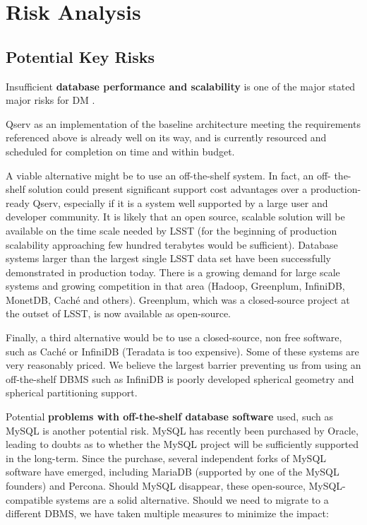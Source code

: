 \documentclass[DM,lsstdraft,toc]{lsstdoc}
\begin{document}
\section{Risk Analysis}\label{risk-analysis}

\subsection{Potential Key Risks}\label{potential-key-risks}

Insufficient \textbf{database performance and scalability} is one of the
major stated major risks for DM .

Qserv as an implementation of the baseline architecture meeting the
requirements referenced above is already well on its way, and is currently
resourced and scheduled for completion on time and within budget.

A viable alternative might be to use an off-the-shelf system. In fact, an off-
the-shelf solution could present significant support cost advantages over a
production-ready Qserv, especially if it is a system well supported by a large
user and developer community. It is likely that an open source, scalable
solution will be available on the time scale needed by LSST (for the beginning
of production scalability approaching few hundred terabytes would be
sufficient). Database systems larger than the largest single LSST data set
have been successfully demonstrated in production today.  There is a growing
demand for large scale systems and growing competition in that area (Hadoop,
Greenplum, InfiniDB, MonetDB, Caché and others).  Greenplum, which was a
closed-source project at the outset of LSST, is now available as open-source.

Finally, a third alternative would be to use a closed-source, non free
software, such as Caché or InfiniDB (Teradata is too expensive). Some of these
systems are very reasonably priced. We believe the largest barrier preventing
us from using an off-the-shelf DBMS such as InfiniDB is poorly developed
spherical geometry and spherical partitioning support.

Potential \textbf{problems with off-the-shelf database software} used,
such as MySQL is another potential risk. MySQL has recently been
purchased by Oracle, leading to doubts as to whether the MySQL project
will be sufficiently supported in the long-term. Since the purchase,
several independent forks of MySQL software have emerged, including
MariaDB (supported by one of the MySQL founders) and Percona. Should MySQL disappear, these open-source,
MySQL-compatible systems are a solid alternative. Should we need to
migrate to a different DBMS, we have taken multiple measures to minimize
the impact:
\end{document}
